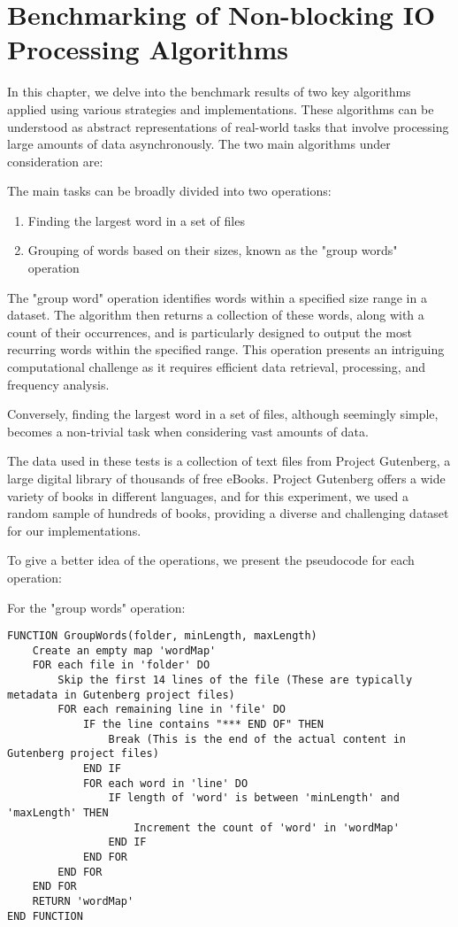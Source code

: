 

\chapter{Benchmarking of Non-blocking IO Processing Algorithms}
\label{cha:a_short_latex_tutorial_with_examples}

In this chapter, we delve into the benchmark results of two key algorithms applied using various strategies and implementations. These algorithms can be understood as abstract representations of real-world tasks that involve processing large amounts of data asynchronously. The two main algorithms under consideration are:

The main tasks can be broadly divided into two operations:

\begin{enumerate}
\item Finding the largest word in a set of files
\item Grouping of words based on their sizes, known as the "group words" operation
\end{enumerate}

The "group word" operation identifies words within a specified size range in a dataset. The algorithm then returns a collection of these words, along with a count of their occurrences, and is particularly designed to output the most recurring words within the specified range. This operation presents an intriguing computational challenge as it requires efficient data retrieval, processing, and frequency analysis.

Conversely, finding the largest word in a set of files, although seemingly simple, becomes a non-trivial task when considering vast amounts of data.

The data used in these tests is a collection of text files from Project Gutenberg, a large digital library of thousands of free eBooks. Project Gutenberg offers a wide variety of books in different languages, and for this experiment, we used a random sample of hundreds of books, providing a diverse and challenging dataset for our implementations.

To give a better idea of the operations, we present the pseudocode for each operation:


For the "group words" operation:

\begin{verbatim}
FUNCTION GroupWords(folder, minLength, maxLength)
    Create an empty map 'wordMap'
    FOR each file in 'folder' DO
        Skip the first 14 lines of the file (These are typically metadata in Gutenberg project files)
        FOR each remaining line in 'file' DO
            IF the line contains "*** END OF" THEN
                Break (This is the end of the actual content in Gutenberg project files)
            END IF
            FOR each word in 'line' DO
                IF length of 'word' is between 'minLength' and 'maxLength' THEN
                    Increment the count of 'word' in 'wordMap'
                END IF
            END FOR
        END FOR
    END FOR
    RETURN 'wordMap'
END FUNCTION

\end{verbatim}

